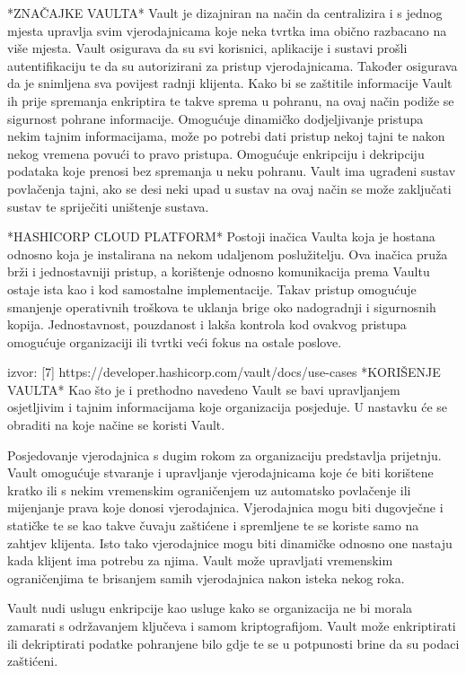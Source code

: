 \documentclass[]{foi}
\begin{document}
*ZNAČAJKE VAULTA*
Vault je dizajniran na način da centralizira i s jednog mjesta upravlja svim vjerodajnicama koje neka tvrtka ima obično razbacano na više mjesta.
Vault osigurava da su svi korisnici, aplikacije i sustavi prošli autentifikaciju te da su autorizirani za pristup vjerodajnicama.
Također osigurava da je snimljena sva povijest radnji klijenta.
Kako bi se zaštitile informacije Vault ih prije spremanja enkriptira te takve sprema u pohranu, na ovaj način podiže se sigurnost pohrane informacije.
Omogućuje dinamičko dodjeljivanje pristupa nekim tajnim informacijama, može po potrebi dati pristup nekoj tajni te nakon nekog vremena povući to pravo pristupa.
Omogućuje enkripciju i dekripciju podataka koje prenosi bez spremanja u neku pohranu. 
Vault ima ugrađeni sustav povlačenja tajni, ako se desi neki upad u sustav na ovaj način se može zaključati sustav te spriječiti uništenje sustava. 

*HASHICORP CLOUD PLATFORM*
Postoji inačica Vaulta koja je hostana odnosno koja je instalirana na nekom udaljenom poslužitelju.
Ova inačica pruža brži i jednostavniji pristup, a korištenje odnosno komunikacija prema Vaultu ostaje ista kao i kod samostalne implementacije.
Takav pristup omogućuje smanjenje operativnih troškova te uklanja brige oko nadogradnji i sigurnosnih kopija.
Jednostavnost, pouzdanost i lakša kontrola kod ovakvog pristupa omogućuje organizaciji ili tvrtki veći fokus na ostale poslove.

izvor: [7] https://developer.hashicorp.com/vault/docs/use-cases
*KORIŠENJE VAULTA*
Kao što je i prethodno navedeno Vault se bavi upravljanjem osjetljivim i tajnim informacijama koje organizacija posjeduje.
U nastavku će se obraditi na koje načine se koristi Vault.

Posjedovanje vjerodajnica s dugim rokom za organizaciju predstavlja prijetnju.
Vault omogućuje stvaranje i upravljanje vjerodajnicama koje će biti korištene kratko ili s nekim vremenskim ograničenjem uz automatsko povlačenje ili mijenjanje prava koje donosi vjerodajnica.
Vjerodajnica mogu biti dugovječne i statičke te se kao takve čuvaju zaštićene i spremljene te se koriste samo na zahtjev klijenta.
Isto tako vjerodajnice mogu biti dinamičke odnosno one nastaju kada klijent ima potrebu za njima. 
Vault može upravljati vremenskim ograničenjima te brisanjem samih vjerodajnica nakon isteka nekog roka.

Vault nudi uslugu enkripcije kao usluge kako se organizacija ne bi morala zamarati s održavanjem ključeva i samom kriptografijom.
Vault može enkriptirati ili dekriptirati podatke pohranjene bilo gdje te se u potpunosti brine da su podaci zaštićeni.
\end{document}
